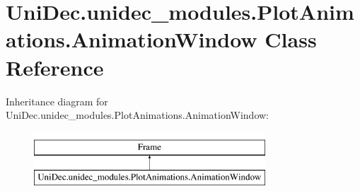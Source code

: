\hypertarget{class_uni_dec_1_1unidec__modules_1_1_plot_animations_1_1_animation_window}{}\section{Uni\+Dec.\+unidec\+\_\+modules.\+Plot\+Animations.\+Animation\+Window Class Reference}
\label{class_uni_dec_1_1unidec__modules_1_1_plot_animations_1_1_animation_window}
Inheritance diagram for Uni\+Dec.\+unidec\+\_\+modules.\+Plot\+Animations.\+Animation\+Window\+:\begin{figure}[H]
\begin{center}
\leavevmode
\includegraphics[height=2.000000cm]{class_uni_dec_1_1unidec__modules_1_1_plot_animations_1_1_animation_window}
\end{center}
\end{figure}
